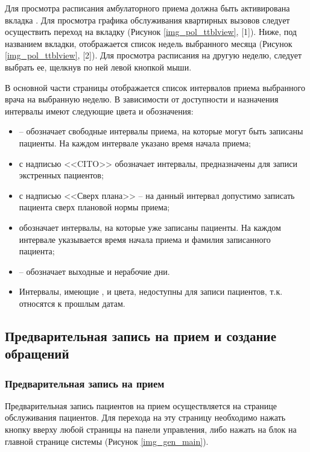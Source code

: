 Для просмотра расписания амбулаторного приема должна быть активирована вкладка . Для просмотра графика обслуживания квартирных вызовов следует осуществить переход на вкладку  (Рисунок \ref{img_pol_ttblview}, [1]). Ниже, под названием вкладки, отображается список недель выбранного месяца (Рисунок \ref{img_pol_ttblview}, [2]). Для просмотра расписания на другую неделю, следует выбрать ее, щелкнув по ней левой кнопкой мыши.

В основной части страницы отображается список интервалов приема выбранного врача на выбранную неделю. В зависимости от доступности и назначения интервалы имеют следующие цвета и обозначения:
\begin{itemize}
 \item {} -- обозначает свободные интервалы приема, на которые могут быть записаны пациенты. На каждом интервале указано время начала приема;
 \item {} с надписью <<CITO>> обозначает интервалы, предназначены для записи экстренных пациентов;
 \item {} с надписью <<Сверх плана>> -- на данный интервал допустимо записать пациента сверх плановой нормы приема;
 \item {} обозначает интервалы, на которые уже записаны пациенты. На каждом интервале указывается время начала приема и фамилия записанного пациента;
 \item {} -- обозначает выходные и нерабочие дни.
 \item Интервалы, имеющие ,  и  цвета, недоступны для записи пациентов, т.к. относятся к прошлым датам.
\end{itemize}


\subsection{Предварительная запись на прием и создание обращений}

\subsubsection{Предварительная запись на прием} \label{pol_predvz}
Предварительная запись пациентов на прием осуществляется на странице обслуживания пациентов. Для перехода на эту страницу необходимо нажать кнопку  вверху любой страницы на панели управления, либо нажать на блок  на главной странице системы (Рисунок \ref{img_gen_main}).


